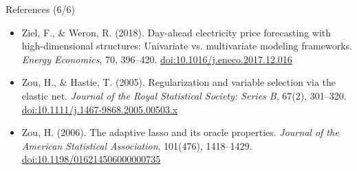 \begin{frame}{References (6/6)}
\begin{itemize}
    \item Ziel, F., \& Weron, R. (2018). Day-ahead electricity price forecasting with high-dimensional structures: Univariate vs. multivariate modeling frameworks. \textit{Energy Economics}, 70, 396--420. \href{https://doi.org/10.1016/j.eneco.2017.12.016}{doi:10.1016/j.eneco.2017.12.016}
    \item Zou, H., \& Hastie, T. (2005). Regularization and variable selection via the elastic net. \textit{Journal of the Royal Statistical Society: Series B}, 67(2), 301--320. \href{https://doi.org/10.1111/j.1467-9868.2005.00503.x}{doi:10.1111/j.1467-9868.2005.00503.x}
    \item Zou, H. (2006). The adaptive lasso and its oracle properties. \textit{Journal of the American Statistical Association}, 101(476), 1418--1429. \href{https://doi.org/10.1198/016214506000000735}{doi:10.1198/016214506000000735}
\end{itemize}
\end{frame}


